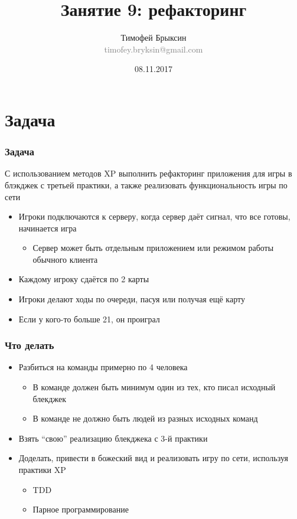 \documentclass[xetex,mathserif,serif]{beamer}
\title{Занятие 9: рефакторинг}
\author[Тимофей Брыксин]{Тимофей Брыксин\\\small{\textcolor{gray}{timofey.bryksin@gmail.com}}}
\date{08.11.2017}
\begin{document}
	\frame{\titlepage}

	\section{Задача}

	\begin{frame}
		\frametitle{Задача}
		С использованием методов XP выполнить рефакторинг приложения для игры в блэкджек с третьей практики, а также реализовать функциональность игры по сети
		\begin{itemize}
			\item Игроки подключаются к серверу, когда сервер даёт сигнал, что все готовы, начинается игра
			\begin{itemize}
				\item Сервер может быть отдельным приложением или режимом работы обычного клиента
			\end{itemize}
			\item Каждому игроку сдаётся по 2 карты
			\item Игроки делают ходы по очереди, пасуя или получая ещё карту
			\item Если у кого-то больше 21, он проиграл
		\end{itemize}
	\end{frame}

	\begin{frame}
		\frametitle{Что делать}
		\begin{itemize}
			\item Разбиться на команды примерно по 4 человека
			\begin{itemize}
				\item В команде должен быть минимум один из тех, кто писал исходный блекджек
				\item В команде не должно быть людей из разных исходных команд 
			\end{itemize}
			\item Взять ``свою'' реализацию блекджека с 3-й практики
			\item Доделать, привести в божеский вид и реализовать игру по сети, используя практики XP
			\begin{itemize}
				\item TDD
				\item Парное программирование
			\end{itemize}
		\end{itemize}
	\end{frame}
\end{document}
